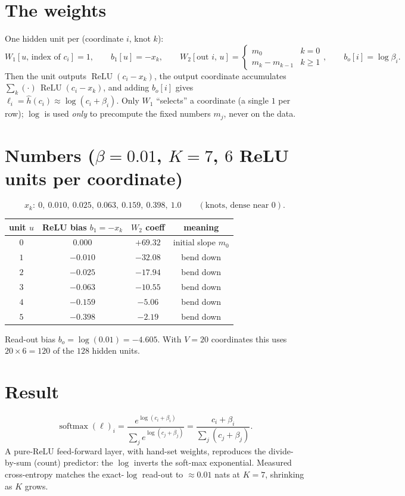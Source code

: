 \documentclass[11pt]{article}
\newcommand{\relu}{\operatorname{ReLU}}
\newcommand{\sm}{\operatorname{softmax}}
\begin{document}
\section{The weights}
One hidden unit per (coordinate $i$, knot $k$):
\[
W_1[u,\,\text{index of }c_i]=1,\qquad
b_1[u]=-x_k,\qquad
W_2[\text{out }i,\,u]=
\begin{cases}m_0 & k=0\\ m_k-m_{k-1} & k\ge 1\end{cases},
\qquad
b_o[i]=\log\beta_i .
\]
Then the unit outputs $\relu(c_i-x_k)$, the output coordinate accumulates
$\sum_k(\cdot)\,\relu(c_i-x_k)$, and adding $b_o[i]$ gives
$\ell_i=\hat h(c_i)\approx\log(c_i+\beta_i)$. Only $W_1$ ``selects'' a coordinate (a
single $1$ per row); $\log$ is used \emph{only} to precompute the fixed numbers
$m_j$, never on the data.

\section{Numbers ($\beta=0.01$, $K=7$, $6$ ReLU units per coordinate)}
\[
x_k:\ 0,\ 0.010,\ 0.025,\ 0.063,\ 0.159,\ 0.398,\ 1.0
\qquad(\text{knots, dense near }0).
\]
\begin{center}
\begin{tabular}{cccc}
\toprule
unit $u$ & ReLU bias $b_1=-x_k$ & $W_2$ coeff & meaning\\
\midrule
$0$ & $0.000$  & $+69.32$ & initial slope $m_0$\\
$1$ & $-0.010$ & $-32.08$ & bend down\\
$2$ & $-0.025$ & $-17.94$ & bend down\\
$3$ & $-0.063$ & $-10.55$ & bend down\\
$4$ & $-0.159$ & $-5.06$  & bend down\\
$5$ & $-0.398$ & $-2.19$  & bend down\\
\bottomrule
\end{tabular}
\end{center}
Read-out bias $b_o=\log(0.01)=-4.605$. With $V=20$ coordinates this uses
$20\times 6=120$ of the $128$ hidden units.

\section{Result}
\[
\sm(\boldsymbol\ell)_i
=\frac{e^{\log(c_i+\beta_i)}}{\sum_j e^{\log(c_j+\beta_j)}}
=\frac{c_i+\beta_i}{\sum_j(c_j+\beta_j)} .
\]
A pure-ReLU feed-forward layer, with hand-set weights, reproduces the divide-by-sum
(count) predictor: the $\log$ inverts the soft-max exponential. Measured cross-entropy
matches the exact-$\log$ read-out to $\approx 0.01$ nats at $K=7$, shrinking as $K$ grows.
\end{document}
